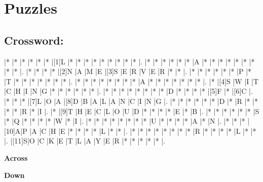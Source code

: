 \documentclass{article}
\begin{document}
\section*{Puzzles}

\subsection*{Crossword:}

\begin{Puzzle}{15}{15} %
|*    |*    |*    |*    |*    |*    |[1]L |*    |*    |*    |*    |*    |*    |*    |*    |*    |.
|*    |*    |*    |*    |*    |*    |A    |*    |*    |*    |*    |*    |*    |*    |*    |*    |.
|*    |*    |*    |*    |[2]N |A    |M    |E    |[3]S |E    |R    |V    |E    |R    |*    |*    |.
|*    |*    |*    |*    |*    |*    |P    |*    |T    |*    |*    |*    |*    |*    |*    |*    |.
|*    |*    |*    |*    |*    |*    |*    |*    |A    |*    |*    |*    |*    |*    |*    |*    |.
|*    |[4]S |W    |I    |T    |C    |H    |I    |N    |G    |*    |*    |*    |*    |*    |*    |.
|*    |*    |*    |*    |*    |*    |*    |*    |D    |*    |*    |*    |*    |[5]F |*    |[6]C |.
|*    |*    |*    |[7]L |O    |A    |[8]D |B    |A    |L    |A    |N    |C    |I    |N    |G    |.
|*    |*    |*    |*    |*    |*    |D    |*    |R    |*    |*    |*    |*    |R    |*    |I    |.
|*    |[9]T |H    |E    |C    |L    |O    |U    |D    |*    |*    |*    |*    |E    |*    |B    |.
|*    |*    |*    |*    |*    |*    |S    |*    |Q    |*    |*    |*    |*    |W    |*    |I    |.
|*    |*    |*    |*    |*    |*    |*    |*    |U    |*    |*    |*    |*    |A    |*    |N    |.
|*    |*    |*    |[10]A|P    |A    |C    |H    |E    |*    |*    |*    |*    |L    |*    |*    |.
|*    |*    |*    |*    |*    |*    |*    |*    |R    |*    |*    |*    |*    |L    |*    |*    |.
|[11]S|O    |C    |K    |E    |T    |L    |A    |Y    |E    |R    |*    |*    |*    |*    |*    |.
\end{Puzzle}


\begin{PuzzleClues}{\textbf{Across}} %
\end{PuzzleClues} %
%
\begin{PuzzleClues}{\textbf{Down}}
\end{PuzzleClues}
\end{document}
